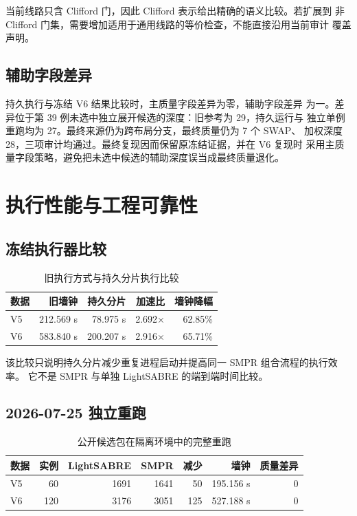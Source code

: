 \documentclass[11pt,a4paper]{article}
\begin{document}
当前线路只含 Clifford 门，因此 Clifford 表示给出精确的语义比较。若扩展到
非 Clifford 门集，需要增加适用于通用线路的等价检查，不能直接沿用当前审计
覆盖声明。

\subsection{辅助字段差异}

持久执行与冻结 V6 结果比较时，主质量字段差异为零，辅助字段差异
为一。差异位于第 39 例未选中独立展开候选的深度：旧参考为 29，持久运行与
独立单例重跑均为 27。最终来源仍为跨布局分支，最终质量仍为 7 个 SWAP、
加权深度 28，三项审计均通过。最终复现因而保留原冻结证据，并在 V6 复现时
采用主质量字段策略，避免把未选中候选的辅助深度误当成最终质量退化。

\section{执行性能与工程可靠性}

\subsection{冻结执行器比较}

\begin{table}[H]
\centering
\caption{旧执行方式与持久分片执行比较}
\begin{tabular}{lrrrr}
\toprule
数据 & 旧墙钟 & 持久分片 & 加速比 & 墙钟降幅 \\
\midrule
V5 & 212.569 s & 78.975 s & 2.692$\times$ & 62.85\% \\
V6 & 583.840 s & 200.207 s & 2.916$\times$ & 65.71\% \\
\bottomrule
\end{tabular}
\end{table}

该比较只说明持久分片减少重复进程启动并提高同一 SMPR 组合流程的执行效率。
它不是 SMPR 与单独 LightSABRE 的端到端时间比较。

\subsection{2026-07-25 独立重跑}

\begin{table}[H]
\centering
\caption{公开候选包在隔离环境中的完整重跑}
\begin{tabular}{lrrrrrr}
\toprule
数据 & 实例 & LightSABRE & SMPR & 减少 & 墙钟 & 质量差异 \\
\midrule
V5 & 60 & 1691 & 1641 & 50 & 195.156 s & 0 \\
V6 & 120 & 3176 & 3051 & 125 & 527.188 s & 0 \\
\bottomrule
\end{tabular}
\end{table}
\end{document}
